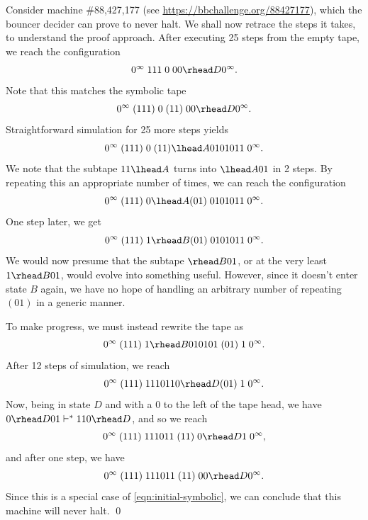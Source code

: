\begin{example}
    Consider machine \#88,427,177 (see \url{https://bbchallenge.org/88427177}),
    which the bouncer decider can prove to never halt. We shall now retrace the
    steps it takes, to understand the proof approach.
    After executing 25 steps from the empty tape, we reach the configuration
    \begin{equation}
        0^\infty\; 111\; 0\; 00 \rhead D 0^\infty.
    \end{equation}
    Note that this matches the symbolic tape
    \begin{equation}
        \label{eqn:initial-symbolic}
        0^\infty\; (111)\; 0\; (11)\; 00 \rhead D 0^\infty.
    \end{equation}
    Straightforward simulation for 25 more steps yields
    \begin{equation}
        0^\infty\; (111)\; 0\; (11) \lhead A 0101011\; 0^\infty.
    \end{equation}
    We note that the subtape $11 \lhead A$ turns into $\lhead A 01$ in 2 steps. By repeating
    this an appropriate number of times, we can reach the configuration
    \begin{equation}
        0^\infty\; (111)\; 0 \lhead A (01)\; 0101011\; 0^\infty.
    \end{equation}
    One step later, we get
    \begin{equation}
        0^\infty\; (111)\; 1 \rhead B (01)\; 0101011\; 0^\infty.
    \end{equation}
    We would now presume that the subtape $\rhead B 01$, or at the very least $1 \rhead B 01$,
    would evolve into something
    useful. However, since it doesn't enter state $B$ again, we have no hope of
    handling an arbitrary number of repeating $(01)$ in a generic manner.

    To make progress, we must instead rewrite the tape as
    \begin{equation}
        0^\infty\; (111)\; 1 \rhead B 010101\; (01)\; 1\; 0^\infty.
    \end{equation}
    After 12 steps of simulation, we reach
    \begin{equation}
        0^\infty\; (111)\; 1110110 \rhead D (01)\; 1\; 0^\infty.
    \end{equation}
    Now, being in state $D$ and with a 0 to the left of the tape head, we have
    $0 \rhead D 01 \vdash^* 110 \rhead D$, and so we reach
    \begin{equation}
        0^\infty\; (111)\; 111011\; (11)\; 0 \rhead D 1\; 0^\infty,
    \end{equation}
    and after one step, we have
    \begin{equation}
        0^\infty\; (111)\; 111011\; (11)\; 00 \rhead D 0^\infty.
    \end{equation}
    Since this is a special case of \eqref{eqn:initial-symbolic}, we can
    conclude that this machine will never halt. \qed
\end{example}

